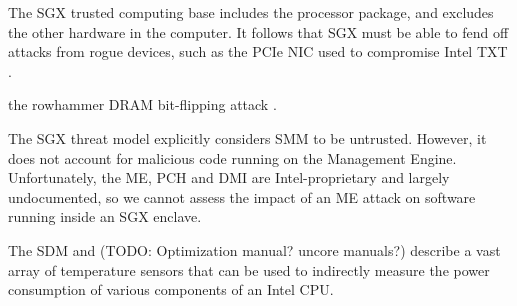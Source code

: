 The SGX trusted computing base includes the processor package, and excludes the
other hardware in the computer. It follows that SGX must be able to fend off
attacks from rogue devices, such as the PCIe NIC used to compromise Intel TXT
\cite{wojtczuk2011txt}.


the rowhammer DRAM bit-flipping attack
\cite{kim2014rowhammer, google2015rowhammer, gruss2015rowhammer}.


The SGX threat model explicitly considers SMM to be untrusted. However, it does
not account for malicious code running on the Management Engine. Unfortunately,
the ME, PCH and DMI are Intel-proprietary and largely undocumented, so we
cannot assess the impact of an ME attack on software running inside an SGX
enclave.

The SDM and (TODO: Optimization manual? uncore manuals?) describe a vast array
of temperature sensors that can be used to indirectly measure the power
consumption of various components of an Intel CPU.

